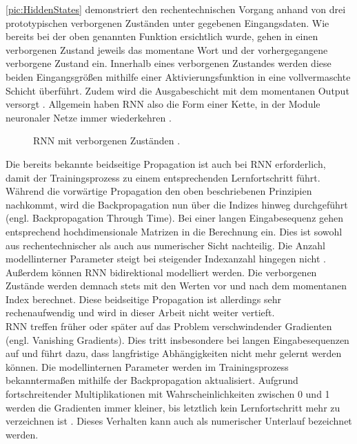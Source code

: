 \noindent
\autoref{pic:HiddenStates} demonstriert den rechentechnischen Vorgang anhand von drei prototypischen verborgenen Zuständen unter gegebenen Eingangsdaten. Wie bereits bei der oben genannten Funktion ersichtlich wurde, gehen in einen verborgenen Zustand jeweils das momentane Wort und der vorhergegangene verborgene Zustand ein. Innerhalb eines verborgenen Zustandes werden diese beiden Eingangsgrößen mithilfe einer Aktivierungsfunktion in eine vollvermaschte Schicht überführt. Zudem wird die Ausgabeschicht mit dem momentanen Output versorgt \cite[S.~325]{ZHA20}. Allgemein haben \ac{RNN} also die Form einer Kette, in der Module neuronaler Netze immer wiederkehren \cite{AIU19}.

\begin{figure}[h!]
  \centering
  \caption{RNN mit verborgenen Zuständen \cite[S.~325]{ZHA20}.}
  \label{pic:HiddenStates}
\end{figure}

\noindent
Die bereits bekannte beidseitige Propagation ist auch bei \ac{RNN} erforderlich, damit der Trainingsprozess zu einem entsprechenden Lernfortschritt führt. Während die vorwärtige Propagation den oben beschriebenen Prinzipien nachkommt, wird die Backpropagation nun über die Indizes hinweg durchgeführt (engl. Backpropagation Through Time). Bei einer langen Eingabesequenz gehen entsprechend hochdimensionale Matrizen in die Berechnung ein. Dies ist sowohl aus rechentechnischer als auch aus numerischer Sicht nachteilig. Die Anzahl modellinterner Parameter steigt bei steigender Indexanzahl hingegen nicht \cite[S.~328,~340]{ZHA20}.\\

\noindent
Außerdem können \ac{RNN} bidirektional modelliert werden. Die verborgenen Zustände werden demnach stets mit den Werten vor und nach dem momentanen Index berechnet. Diese beidseitige Propagation ist allerdings sehr rechenaufwendig und wird in dieser Arbeit nicht weiter vertieft.\\

\noindent
\ac{RNN} treffen früher oder später auf das Problem verschwindender Gradienten (engl. Vanishing Gradients). Dies tritt insbesondere bei langen Eingabesequenzen auf und führt dazu, dass langfristige Abhängigkeiten nicht mehr gelernt werden können. Die modellinternen Parameter werden im Trainingsprozess bekanntermaßen mithilfe der Backpropagation aktualisiert. Aufgrund fortschreitender Multiplikationen mit Wahrscheinlichkeiten zwischen 0 und 1 werden die Gradienten immer kleiner, bis letztlich kein Lernfortschritt mehr zu verzeichnen ist \cite{ARB18}. Dieses Verhalten kann auch als numerischer Unterlauf bezeichnet werden.\\

